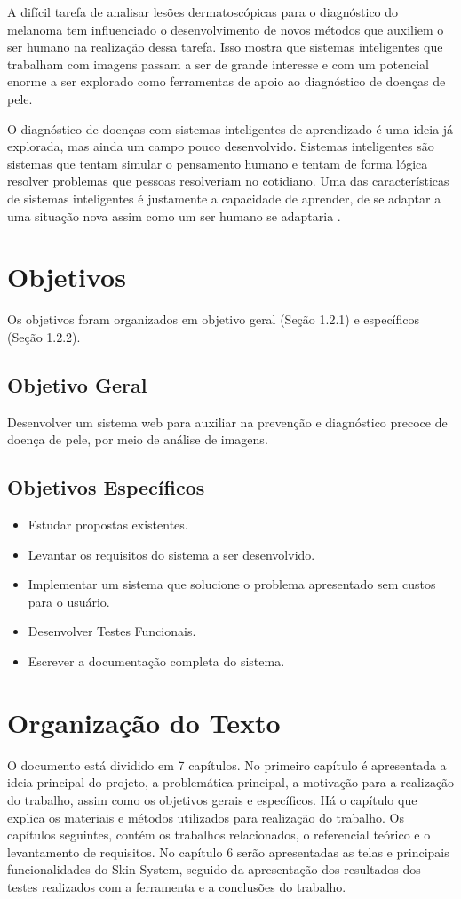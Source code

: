 \documentclass[openright]{ifrs} %
\begin{document}
A difícil tarefa de analisar lesões dermatoscópicas para o diagnóstico do melanoma tem influenciado o desenvolvimento de novos métodos que auxiliem o ser humano na realização dessa tarefa. Isso mostra que sistemas inteligentes que trabalham com imagens passam a ser de grande interesse e com um potencial enorme a ser explorado como ferramentas de apoio ao diagnóstico de doenças de pele.

O diagnóstico de doenças com sistemas inteligentes de aprendizado é uma ideia já explorada, mas ainda um campo pouco desenvolvido. Sistemas inteligentes são sistemas que tentam simular o pensamento humano e tentam de forma lógica resolver problemas que pessoas resolveriam no cotidiano. Uma das características de sistemas inteligentes é justamente a capacidade de aprender, de se adaptar a uma situação nova assim como um ser humano se adaptaria \cite{rezende2003sistemas}.
\section{Objetivos}
Os objetivos foram organizados em objetivo geral (Seção 1.2.1) e específicos (Seção 1.2.2).
\subsection{Objetivo Geral}
Desenvolver um sistema web para auxiliar na prevenção e diagnóstico precoce de doença de pele, por meio de análise de imagens.
\subsection{Objetivos Específicos}
\begin{itemize}
 \item Estudar propostas existentes.
 \item Levantar os requisitos do sistema a ser desenvolvido.
 \item Implementar um sistema que solucione o problema apresentado sem custos para o usuário.
 \item Desenvolver Testes Funcionais.
 \item Escrever a documentação completa do sistema.
\end{itemize}

\section{Organização do Texto}
O documento está dividido em 7 capítulos. No primeiro capítulo é apresentada a ideia principal do projeto, a problemática principal, a motivação para a realização do trabalho, assim como os objetivos gerais e específicos. Há o capítulo que
explica os materiais e métodos utilizados para realização do trabalho. Os capítulos seguintes, contém os trabalhos relacionados, o referencial teórico e o levantamento de requisitos.
No capítulo 6 serão apresentadas as telas e principais funcionalidades do Skin System, seguido da apresentação dos resultados dos testes realizados com  a ferramenta e a conclusões do trabalho.
\end{document}
